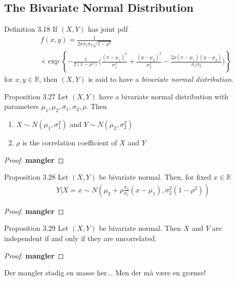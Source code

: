 \subsection{The Bivariate Normal Distribution}
\begin{boks}{Definition 3.18}
  If $(X, Y)$ has joint pdf
  \begin{align*}
    &f(x,y) = \frac{1}{2\pi\sigma_1\sigma_2\sqrt{1 - \rho^2}}\\
    &\times \exp \left\{ -\frac{1}{2(1-\rho^2)} \bigg( \frac{(x-\mu_1)^2}{\sigma_1^2} + \frac{(y-\mu_2)^2}{\sigma_2^2} -
    \frac{2\rho (x-\mu_1)(y-\mu_2)}{\sigma_1\sigma_2} \bigg) \right\}
  \end{align*}
  for $x,y \in \mathbb{R}$, then $(X,Y)$ is said to have a \textit{bivariate normal distribution}.
\end{boks}
\begin{boks}{Proposition 3.27}
  Let $(X,Y)$ have a bivariate normal distribution with parameters $\mu_1, \mu_2, \sigma_1, \sigma_2, \rho$. Then
  \begin{enumerate}
    \item $X \sim N(\mu_1, \sigma_1^2)$ and $Y \sim N(\mu_2, \sigma_2^2)$
    \item $\rho$ is the correlation coefficient of $X$ and $Y$
  \end{enumerate}
\end{boks}
\begin{proof}
  \textbf{mangler}
\end{proof}
\begin{boks}{Proposition 3.28}
  Let $(X, Y)$ be bivariate normal. Then, for fixed $x \in \mathbb{R}$
  \begin{align*}
    Y|X = x \sim N \left( \mu_2 + \rho\frac{\sigma_2}{\sigma_1}(x - \mu_1)
    , \sigma_2^2(1 - \rho^2) \right)
  \end{align*}
\end{boks}
\begin{proof}
  \textbf{mangler}
\end{proof}
\begin{boks}{Proposition 3.29}
  Let $(X,Y)$ be bivariate normal. Then $X$ and $Y$ are independent if and only if they are uncorrelated.
\end{boks}
\begin{proof}
  \textbf{mangler}
\end{proof}

Der mangler stadig en masse her... Men der må være en grænse!
